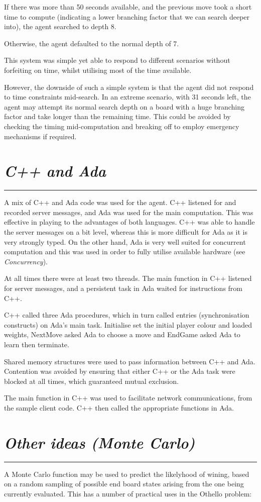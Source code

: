 \documentclass[10pt]{report}
\begin{document}
\begin{multicols}{2}
If there was more than 50 seconds available, and the previous move took a short time to compute (indicating a lower branching factor that we can search deeper into), the agent searched to depth 8.

Otherwise, the agent defaulted to the normal depth of 7.

This system was simple yet able to respond to different scenarios without forfeiting on time, whilst utilising most of the time available.

However, the downside of such a simple system is that the agent did not respond to time constraints mid-search. In an extreme scenario, with 31 seconds left, the agent may attempt its normal search depth on a board with a huge branching factor and take longer than the remaining time. This could be avoided by checking the timing mid-computation and breaking off to employ emergency mechanisms if required.
\section*{\emph{C++ and Ada}}
\hrule
A mix of C++ and Ada code was used for the agent. C++ listened for and recorded server messages, and Ada was used for the main computation. This was effective in playing to the advantages of both languages. C++ was able to handle the server messages on a bit level, whereas this is more difficult for Ada as it is very strongly typed. On the other hand, Ada is very well suited for concurrent computation and this was used in order to fully utilise available hardware (see \emph{Concurrency}).

At all times there were at least two threads. The main function in C++ listened for server messages, and a persistent task in Ada waited for instructions from C++.

C++ called three Ada procedures, which in turn called entries (synchronisation constructs) on Ada's main task. Initialise set the initial player colour and loaded weights, NextMove asked Ada to choose a move and EndGame asked Ada to learn then terminate.

Shared memory structures were used to pass information between C++ and Ada. Contention was avoided by ensuring that either C++ or the Ada task were blocked at all times, which guaranteed mutual exclusion.

The main function in C++ was used to facilitate network communications, from the sample client code. C++ then called the appropriate functions in Ada.

\section*{\emph{Other ideas (Monte Carlo)}}
\hrule
A Monte Carlo function may be used to predict the likelyhood of wining, based on a random sampling of possible end board states arising from the one being currently evaluated. This has a number of practical uses in the Othello problem:


\end{multicols}
\end{document}
